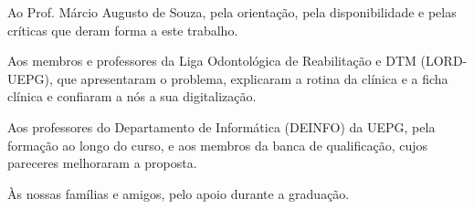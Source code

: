 
Ao Prof. Márcio Augusto de Souza, pela orientação, pela disponibilidade e pelas críticas que deram forma a este trabalho.

Aos membros e professores da Liga Odontológica de Reabilitação e DTM (LORD-UEPG), que apresentaram o problema, explicaram a rotina da clínica e a ficha clínica e confiaram a nós a sua digitalização.

Aos professores do Departamento de Informática (DEINFO) da UEPG, pela formação ao longo do curso, e aos membros da banca de qualificação, cujos pareceres melhoraram a proposta.

Às nossas famílias e amigos, pelo apoio durante a graduação.
